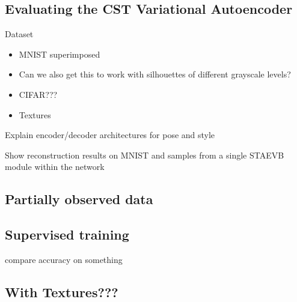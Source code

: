 
\subsection{Evaluating the CST Variational Autoencoder}

Dataset
\begin{itemize}
\item MNIST superimposed
\item Can we also get this to work with silhouettes of different grayscale levels?
\item CIFAR???
\item Textures
\end{itemize}


Explain encoder/decoder architectures for pose and style

Show reconstruction results on MNIST and samples from a single STAEVB module within the network


\subsection{Partially observed data}




\subsection{Supervised training}

compare accuracy on something



\subsection{With Textures???}












